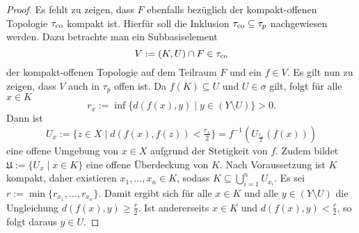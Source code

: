 \begin{proof}
  Es fehlt zu zeigen, dass $F$ ebenfalls bezüglich der kompakt\hyp{}offenen Topologie $\tau_{\mathrm{co}}$ kompakt ist.
  Hierfür soll die Inklusion $\tau_{\mathrm{co}} \subseteq \tau_p$ nachgewiesen werden.
  Dazu betrachte man ein Subbasiselement 
  \begin{displaymath}
    V := (K,U) \cap F \in \tau_{\mathrm{co}}
  \end{displaymath}
  der kompakt\hyp{}offenen Topologie auf dem Teilraum $F$ und ein $f \in V$.
  Es gilt nun zu zeigen, dass $V$ auch in $\tau_p$ offen ist.
  Da $f(K) \subseteq U$ und $U \in \sigma$ gilt, folgt für alle $x \in K$
  \begin{displaymath}
    r_x := \inf\{d(f(x),y) \mid y \in (Y \setminus U) \} > 0.
  \end{displaymath}
  Dann ist 
  \begin{displaymath}
    U_x := \{ z \in X \mid d(f(x),f(z)) < \tfrac{r_x}{2}\} = f^{-1}\left( U_{\tfrac{r_x}{2}}(f(x))\right)
  \end{displaymath} 
  eine offene Umgebung von $x \in X$ aufgrund der Stetigkeit von $f$.
  Zudem bildet $\mathfrak{U} := \{U_x \mid x \in K\}$ eine offene Überdeckung von $K$. 
  Nach Voraussetzung ist $K$ kompakt, daher existieren $x_1,\dots,x_n \in K$, sodass $K \subseteq \bigcup_{i=1}^n U_{x_i}$.
  Es sei $r:= \min\{r_{x_1},\dots,r_{x_n}\}$. 
  Damit ergibt sich für alle $x \in K$ und alle $y \in (Y \setminus U)$ die Ungleichung $d(f(x),y) \geq \tfrac{r}{2}$.
  Ist andererseits $x \in K$ und $d(f(x),y) < \tfrac{r}{2}$, so folgt daraus $y \in U$.


\end{proof}
